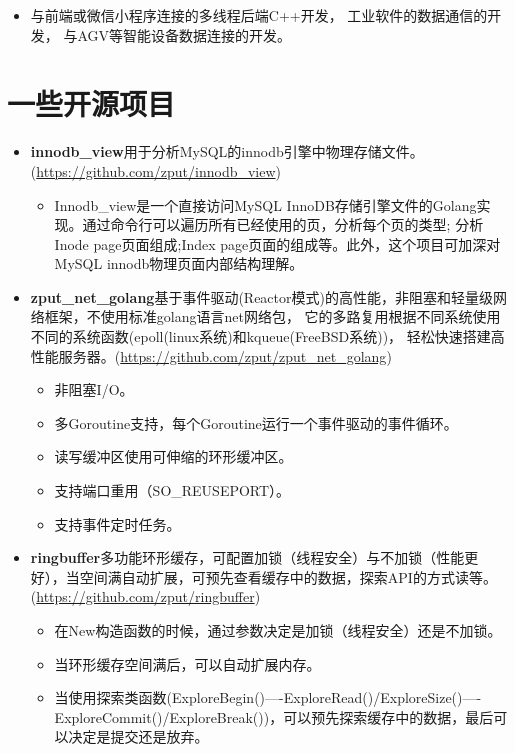 \documentclass{resume}
\begin{document}
\begin{itemize}[parsep=0.2ex]
  \item 与前端或微信小程序连接的多线程后端C++开发， 工业软件的数据通信的开发， 与AGV等智能设备数据连接的开发。
\end{itemize}

\section{一些开源项目}
\begin{itemize}[parsep=0.2ex]
  \item \textbf{innodb\_view}用于分析MySQL的innodb引擎中物理存储文件。(\url{https://github.com/zput/innodb\_view})
    \begin{itemize}[parsep=0.2ex]
        \item Innodb\_view是一个直接访问MySQL InnoDB存储引擎文件的Golang实现。通过命令行可以遍历所有已经使用的页，分析每个页的类型; 分析Inode page页面组成;Index page页面的组成等。此外，这个项目可加深对MySQL innodb物理页面内部结构理解。
    \end{itemize}

  \item \textbf{zput\_net\_golang}基于事件驱动(Reactor模式)的高性能，非阻塞和轻量级网络框架，不使用标准golang语言net网络包， 它的多路复用根据不同系统使用不同的系统函数(epoll(linux系统)和kqueue(FreeBSD系统))， 轻松快速搭建高性能服务器。(\url{https://github.com/zput/zput\_net\_golang})
    \begin{itemize}[parsep=0.2ex]
          \item 非阻塞I/O。
          \item 多Goroutine支持，每个Goroutine运行一个事件驱动的事件循环。
          \item 读写缓冲区使用可伸缩的环形缓冲区。
          \item 支持端口重用（SO\_REUSEPORT）。
          \item 支持事件定时任务。
    \end{itemize}

  \item \textbf{ringbuffer}多功能环形缓存，可配置加锁（线程安全）与不加锁（性能更好），当空间满自动扩展，可预先查看缓存中的数据，探索API的方式读等。(\url{https://github.com/zput/ringbuffer})
    \begin{itemize}[parsep=0.2ex]
          \item 在New构造函数的时候，通过参数决定是加锁（线程安全）还是不加锁。
          \item 当环形缓存空间满后，可以自动扩展内存。
          \item 当使用探索类函数(ExploreBegin()----ExploreRead()/ExploreSize()----ExploreCommit()/ExploreBreak())，可以预先探索缓存中的数据，最后可以决定是提交还是放弃。
    \end{itemize}


\end{itemize}
\end{document}
